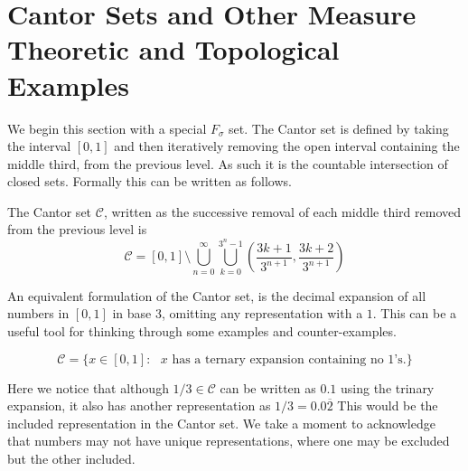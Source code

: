\section{Cantor Sets and Other Measure Theoretic and Topological Examples}
We begin this section with a special $F_\sigma$ set.  The Cantor set is defined by taking the interval $[0,1]$ and then iteratively removing the open interval containing the middle third, from the previous level.  As such it is the countable intersection of closed sets.  Formally this can be written as follows.
\begin{definition}
    The Cantor set $\mathcal{C}$, written as the successive removal of each middle third removed from the previous level is 
    $$\mathcal{C} = [0,1] \setminus \bigcup_{n=0}^\infty\bigcup_{k=0}^{3^n-1}\left(\frac{3k+1}{3^{n+1}},\frac{3k+2}{3^{n+1}}\right)$$
\end{definition}
An equivalent formulation of the Cantor set, is the decimal expansion of all numbers in $[0,1]$ in base $3$, omitting any representation with a $1$. This can be a useful tool for thinking through some examples and counter-examples.
\begin{example}
    $$\mathcal{C}  = \{ x \in [0,1]: \text{ $x$ has a ternary expansion containing no $1$'s.}\}$$
\end{example}
Here we notice that although $1/3 \in \mathcal{C} $ can be written as $0.1$ using the trinary expansion, it also has another representation as $1/3 = 0.0\overline{2}$  This would be the included representation in the Cantor set.  We take a moment to acknowledge that numbers may not have unique representations, where one may be excluded but the other included.  

